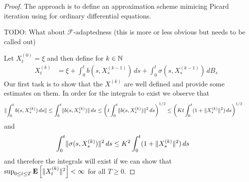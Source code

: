 \begin{proof}
The approach is to define an approximation scheme mimicing Picard iteration using for ordinary differential equations.  

TODO: What about $\mathcal{F}$-adaptedness (this is more or less obvious but needs to be called out)

Let $X^{(0)}_t = \xi$ and then define for $k \in \mathbb{N}$
\begin{align*}
X^{(k)}_t &= \xi + \int_0^t b(s, X^{(k-1)}_s) \, ds + \int_0^t \sigma(s, X^{(k-1)}_s) \, dB_s
\end{align*}
Our first task is to show that the $X^{(k)}$ are well defined and provide some estimates on them.  In order for the integrals to exist
we observe that
\begin{align*}
\lVert \int_0^t b(s, X^{(k)}_s) \, ds \rVert 
&\leq
\int_0^t \lVert b(s, X^{(k)}_s) \rVert \, ds 
\leq  \left( t \int_0^t \lVert b(s, X^{(k)}_s) \rVert^2 \, ds \right )^{1/2} 
\leq \left( K t \int_0^t (1 + \lVert X^{(k)}_s \rVert^2) \, ds\right )^{1/2}
\end{align*}
and 
\begin{align*}
\int_0^t \lVert \sigma(s, X^{(k)}_s) \rVert^2 \, ds
&\leq
K^2\int_0^t (1 + \lVert X^{(k)}_s \rVert^2) \, ds
\end{align*}
and therefore the integrals will exist if we can show that $\sup_{0 \leq t \leq T} \textbf{E}\left[\lVert X^{(k)}_t \rVert^2\right] < \infty$ for all $T \geq 0$.


\end{proof}

